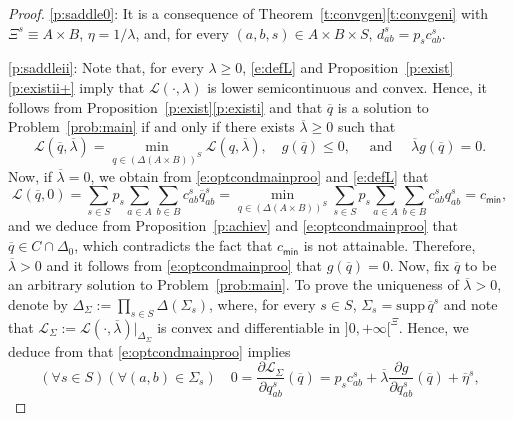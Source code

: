 \documentclass[smallextended,referee,envcountsect,]{svjour3}
\newcommand{\supp}{\mathrm{supp}\,}
\begin{document}
\begin{proof}
\ref{p:saddle0}: It is a consequence of 
Theorem~\ref{t:convgen}\eqref{t:convgeni} with $\Xi^s\equiv 
A\times B$, $\eta=1/\lambda$, and, for every $(a,b,s)\in A\times 
B\times S$, $d_{ab}^s=p_sc_{ab}^s$.

\ref{p:saddleii}:
Note that, for every $\lambda\ge 0$, \eqref{e:defL} and 
Proposition~\ref{p:exist}\eqref{p:existii+} imply that  
$\mathcal{L} 
(\cdot,\lambda)$ is lower semicontinuous and convex. Hence, it 
follows from 
Proposition~\ref{p:exist}\eqref{p:existi}
and 
{\cite[Theorem~28.2]{rockafellar1997convex}}  that 
$\overline{q}$ is a 
solution to 
Problem~\ref{prob:main} if and only if
there {exists $\overline{\lambda}\ge0$} such that 
\begin{equation}
\label{e:optcondmainproo}
\mathcal{L} 
(\overline{q},\overline{\lambda})=\min_{q \in 
(\Delta(A\times 
B))^{ S}}\mathcal{L} (q,\overline{\lambda}),\quad 
g(\overline{q})\le0,\quad 
\text{ and }\quad \overline{\lambda}g(\overline{q})=0.
\end{equation}
Now, if 
$\overline{\lambda}=0$,  we obtain from 
\eqref{e:optcondmainproo} 
and
\eqref{e:defL} that
\begin{equation}
\mathcal{L}(\overline{q},0)=\sum_{s\in S}p_s\sum_{a\in 
A}\sum_{b\in 
B}c_{ab}^s\overline{q}_{ab}^s =\min_{q\in 
(\Delta(A\times B))^S}
\sum_{s\in S}p_s\sum_{a\in A}\sum_{b\in 
B}c_{ab}^sq_{ab}^s =c_{\mathsf{min}},\label{e:CminL0}
\end{equation}
and we deduce from Proposition~\ref{p:achiev} and 
\eqref{e:optcondmainproo} that 
$\overline{q}\in 
C\cap \Delta_0$, which contradicts the fact that
$c_{\mathsf{min}}$ is not attainable.
Therefore, $\overline{\lambda}>0$ and it follows from 
\eqref{e:optcondmainproo} that $g(\overline{q})=0$.
Now, fix $\overline{q}$ to be an arbitrary solution to 
Problem~\ref{prob:main}. To prove the uniqueness of 
$\overline{\lambda}>0$, denote by $\Delta_{\Sigma}:=\prod_{s\in 
S}\Delta(\Sigma_s)$, where,
for every $s\in S$, 
$\Sigma_s=\supp\overline{q}^s$ and note that 
$\mathcal{L}_{\Sigma}:=\mathcal{L}(\cdot,\overline{\lambda})|_{\Delta_{\Sigma}}$
 is 
convex and
differentiable in $]0,+\infty[^{\Xi}$.
Hence, we deduce from  
\cite[Theorem~28.2]{rockafellar1997convex}
that \eqref{e:optcondmainproo} implies
\begin{equation}
\label{e:uniq1}
(\forall s\in S)(\forall (a,b)\in\Sigma_s)\quad 0=\frac{\partial 
\mathcal{L}_{\Sigma}}{\partial q_{ab}^s}(\overline{q})=p_sc_{ab}^s+
\overline{\lambda}\frac{\partial 
g}{\partial q_{ab}^s}(\overline{q})+\overline{\eta}^s,

\end{equation}
\end{proof}
\end{document}
